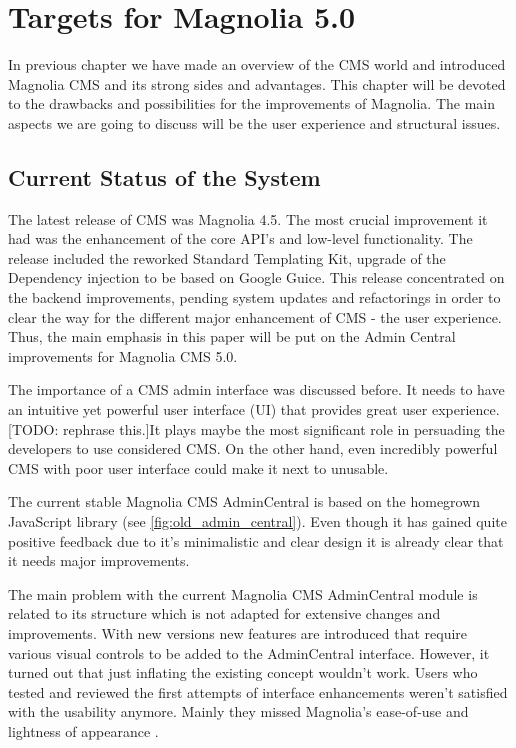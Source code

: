 \chapter{Targets for Magnolia 5.0}
\label{thesis_problems}

In previous chapter we have made an overview of the CMS world and introduced
Magnolia CMS and its strong sides and advantages. This chapter will be devoted
to the drawbacks and possibilities for the improvements of Magnolia. The main aspects we
are going to discuss will be the user experience and structural issues.

\section{Current Status of the System}
The latest release of CMS was Magnolia 4.5. The most crucial improvement it had
was the enhancement of the core API's and low-level functionality. The release
included the reworked Standard Templating Kit, upgrade of the Dependency
injection to be based on Google Guice. This release concentrated on the backend
improvements, pending system updates and refactorings in order to clear the way
for the different major enhancement of CMS - the user experience. Thus, the main
emphasis in this paper will be put on the Admin Central improvements for
Magnolia CMS 5.0.

The importance of a CMS admin interface was discussed before. It needs to have
an intuitive yet powerful user interface (UI) that provides great user
experience. [TODO: rephrase this.]It plays maybe the most significant role in
persuading the developers to use considered CMS. On the other hand, even
incredibly powerful CMS with poor user interface could make it next to unusable.

The current stable Magnolia CMS AdminCentral is based on the homegrown
JavaScript library (see \ref{fig:old_admin_central}). Even though it has gained
quite positive feedback due to it's minimalistic and clear design it is already
clear that it needs major improvements.

The main problem with the current Magnolia CMS AdminCentral module is related to
its structure which is not adapted for extensive changes and improvements. With
new versions new features are introduced that require various visual controls to
be added to the AdminCentral interface. However, it turned out that just
inflating the existing concept wouldn't work.
Users who tested and reviewed the first attempts of interface enhancements
weren't satisfied with the usability anymore.
Mainly they missed Magnolia's ease-of-use and lightness of appearance
\cite{bkg_of_new_design}.

